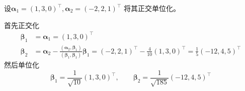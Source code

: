 \begin{example}
    设$\bm{\alpha}_1=(1,3,0)^\intercal, \bm{\alpha}_2 = (-2,2,1)^\intercal$
    将其正交单位化。
\end{example}
\begin{solution}
    首先正交化
    \begin{align*}
        \bm{\beta}_1 & = \bm{\alpha}_1   =   (1,3,0)^\intercal                                                                                                                                                \\
        \bm{\beta}_2 & = \bm{\alpha}_2 - \frac{(\bm{\alpha}_2,\bm{\beta}_1)}{(\bm{\beta}_1, \bm{\beta}_1)}\bm{\beta}_1  = (-2,2,1)^\intercal - \frac{4}{10}(1,3,0)^\intercal = \frac{1}{5}(-12,4,5)^\intercal
    \end{align*}
    然后单位化
    \[
        \bm{\beta}_1 = \frac{1}{\sqrt{10}}(1,3,0)^\intercal,\qquad \bm{\beta}_2 = \frac{1}{\sqrt{185}}(-12,4,5)^\intercal
    \]
\end{solution}